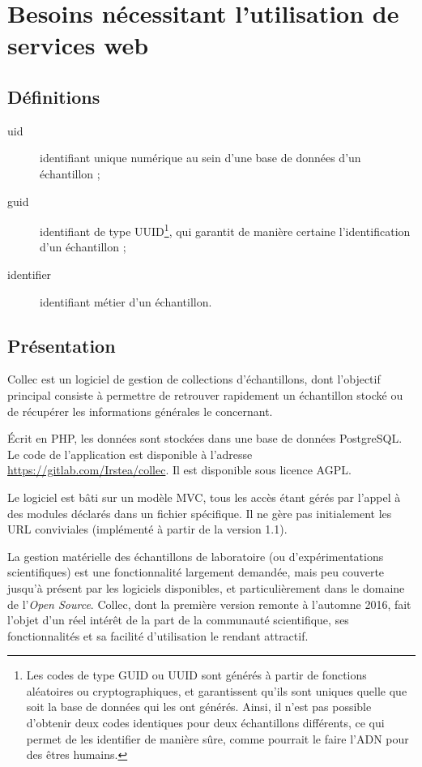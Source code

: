 \chapter{Besoins nécessitant l'utilisation de services web}

\section{Définitions}

\begin{description}
\item[uid] identifiant unique numérique au sein d'une base de données d'un échantillon ;
\item[guid] identifiant de type UUID\footnote{Les codes de type GUID ou UUID sont générés à partir de fonctions aléatoires ou cryptographiques, et garantissent qu'ils sont uniques quelle que soit la base de données qui les ont générés. Ainsi, il n'est pas possible d'obtenir deux codes identiques pour deux échantillons différents, ce qui permet de les identifier de manière sûre, comme pourrait le faire l'ADN pour des êtres humains.}, qui garantit de manière certaine l'identification d'un échantillon ;
\item [identifier] identifiant \og métier \fg d'un échantillon.
\end{description}
\section{Présentation}
Collec est un logiciel de gestion de collections d'échantillons, dont l'objectif principal consiste à permettre de retrouver rapidement un échantillon stocké ou de récupérer les informations générales le concernant.

Écrit en PHP, les données sont stockées dans une base de données PostgreSQL. Le code de l'application est disponible à l'adresse \url{https://gitlab.com/Irstea/collec}. Il est disponible sous licence AGPL.

Le logiciel est bâti sur un modèle MVC, tous les accès étant gérés par l'appel à des modules déclarés dans un fichier spécifique. Il ne gère pas initialement les URL conviviales (implémenté à partir de la version 1.1).

La gestion matérielle des échantillons de laboratoire (ou d'expérimentations scientifiques) est une fonctionnalité largement demandée, mais peu couverte jusqu'à présent par les logiciels disponibles, et particulièrement dans le domaine de l'\textit{Open Source}. Collec, dont la première version remonte à l'automne 2016, fait l'objet d'un réel intérêt de la part de la communauté scientifique, ses fonctionnalités et sa facilité d'utilisation le rendant attractif.

